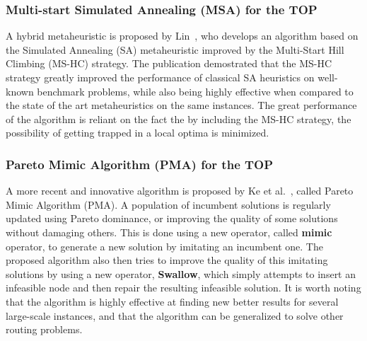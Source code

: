 \subsubsection{Multi-start Simulated Annealing (MSA) for the TOP}

    A hybrid metaheuristic is proposed by Lin~\cite{lin2013}, who develops an algorithm based on the Simulated Annealing (SA) metaheuristic improved by the Multi-Start Hill Climbing (MS-HC) strategy. The publication demostrated that the MS-HC strategy greatly improved the performance of classical SA heuristics on well-known benchmark problems, while also being highly effective when compared to the state of the art metaheuristics on the same instances. The great performance of the algorithm is reliant on the fact the by including the MS-HC strategy, the possibility of getting trapped in a local optima is minimized.

\subsubsection{Pareto Mimic Algorithm (PMA) for the TOP}

    A more recent and innovative algorithm is proposed by Ke et al.~\cite{kee2015}, called Pareto Mimic Algorithm (PMA). A population of incumbent solutions is regularly updated using Pareto dominance, or improving the quality of some solutions without damaging others. This is done using a new operator, called \textbf{mimic} operator, to generate a new solution by imitating an incumbent one. The proposed algorithm also then tries to improve the quality of this imitating solutions by using a new operator, \textbf{Swallow}, which simply attempts to insert an infeasible node and then repair the resulting infeasible solution. It is worth noting that the algorithm is highly effective at finding new better results for several large-scale instances, and that the algorithm can be generalized to solve other routing problems.